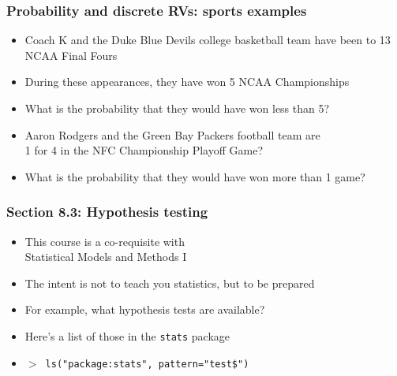 \documentclass[11pt,pdftex,dvipsnames,usenames,helvetica]{beamer}
\begin{document}
\begin{frame}
\frametitle{Probability and discrete RVs: sports examples}
\begin{itemize}
\item Coach K and the Duke Blue Devils college basketball team
have been to 13 NCAA Final Fours
\item During these appearances, they have won 5 NCAA Championships
\item What is the probability that they would have won less than 5?
\item Aaron Rodgers and the Green Bay Packers football team are\\ 
1 for 4 in the NFC Championship Playoff Game?
\item What is the probability that they would have won more than 1 game?
\end{itemize}
\end{frame}

\begin{frame}
\frametitle{Section 8.3: Hypothesis testing}

\begin{itemize}
\item This course is a co-requisite with\\
 Statistical Models and Methods I
\item The intent is not to teach you statistics, but to be prepared
\item For example, what hypothesis tests are available?
\item Here's a list of those in the {\tt stats} package
\item {\tt $>$ ls("package:stats", pattern="test\$")}
 \end{itemize}

\end{frame} 
\end{document}
